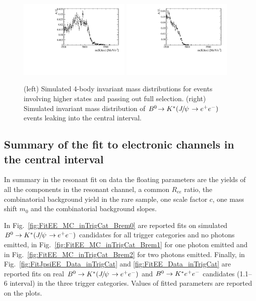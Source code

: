 \begin{figure}[h!]
\centering
\includegraphics[width=0.48\textwidth]{RKst/figs/misreco/part_had.pdf}
\includegraphics[width=0.48\textwidth]{RKst/figs/misreco/jpsi_leakage.pdf}
\caption{(left) Simulated 4-body invariant mass distributions for events involving
higher \Kstar states and passing out full selection. (right) Simulated invariant mass
distribution of $\decay{\Bz}{\Kstar(\jpsi\to\ee)}$ events leaking into the central \qsq interval.}
\label{fig:RKst_rare_misreco_distrib}
\end{figure}


\subsection{Summary of the fit to electronic channels in the central \qsq interval}

In summary in the resonant fit on data the floating parameters are the yields of all the components
in the resonant channel, a common $R_{ee}$ ratio, the combinatorial background yield in the rare sample,
one scale factor $c$, one mass shift $m_0$ and the combinatorial background slopes.

In Fig.~\ref{fig:FitEE_MC_inTrigCat_Brem0} are reported fits on simulated $\Bz\to\Kstar(\jpsi\to\ee)$ candidates for
all trigger categories and no photons emitted, in Fig.~\ref{fig:FitEE_MC_inTrigCat_Brem1} for one photon emitted
and in Fig.~\ref{fig:FitEE_MC_inTrigCat_Brem2} for two photons emitted. Finally, in
Fig.~\ref{fig:FitJpsiEE_Data_inTrigCat} and \ref{fig:FitEE_Data_inTrigCat} are reported fits
on real $\Bz\to\Kstar(\jpsi\to\ee)$ and ${{B}^0}\rightarrow{\ensuremath{{K}^*}} e^+ e^-$ candidates (1.1--6 \gevgevcccc interval)
in the three trigger categories. Values of fitted parameters are reported on the plots.

